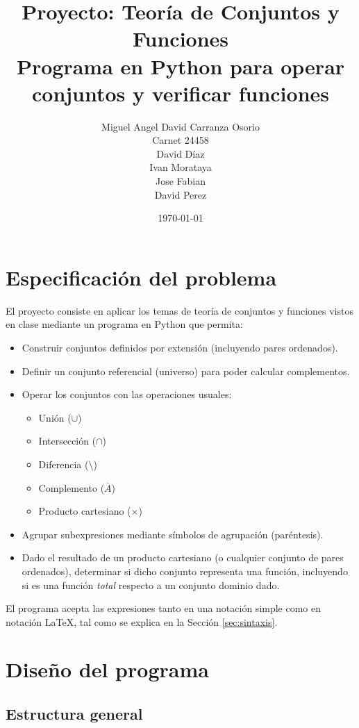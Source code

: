 \documentclass[11pt]{article}
\title{Proyecto: Teoría de Conjuntos y Funciones \\ \large Programa en Python para operar conjuntos y verificar funciones}
\author{
Miguel Angel David Carranza Osorio \\ Carnet 24458 \\[4pt]
David Díaz \\
Ivan Morataya \\
Jose Fabian \\
David Perez
}
\date{\today}
\begin{document}
\maketitle

\section{Especificación del problema}

El proyecto consiste en aplicar los temas de teoría de conjuntos y funciones vistos en
clase mediante un programa en Python que permita:

\begin{itemize}
  \item Construir conjuntos definidos por extensión (incluyendo pares ordenados).
  \item Definir un conjunto referencial (universo) para poder calcular complementos.
  \item Operar los conjuntos con las operaciones usuales:
  \begin{itemize}
    \item Unión ($\cup$)
    \item Intersección ($\cap$)
    \item Diferencia ($\setminus$)
    \item Complemento ($\overline{A}$)
    \item Producto cartesiano ($\times$)
  \end{itemize}
  \item Agrupar subexpresiones mediante símbolos de agrupación (paréntesis).
  \item Dado el resultado de un producto cartesiano (o cualquier conjunto de pares
  ordenados), determinar si dicho conjunto representa una función, incluyendo si es
  una función \emph{total} respecto a un conjunto dominio dado.
\end{itemize}

El programa acepta las expresiones tanto en una notación simple como en notación
LaTeX, tal como se explica en la Sección \ref{sec:sintaxis}.

\section{Diseño del programa}

\subsection{Estructura general}
\end{document}
